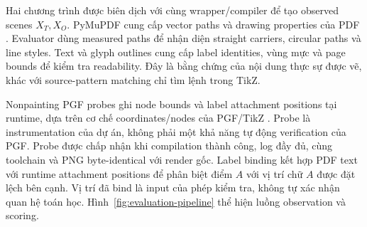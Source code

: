 \documentclass[a4paper,12pt]{article}
\begin{document}
Hai chương trình được biên dịch với cùng wrapper/compiler để tạo observed scenes $X_T,X_O$. PyMuPDF cung cấp vector paths và drawing properties của PDF \cite{pymupdf}. Evaluator dùng measured paths để nhận diện straight carriers, circular paths và line styles. Text và glyph outlines cung cấp label identities, vùng mực và page bounds để kiểm tra readability. Đây là bằng chứng của nội dung thực sự được vẽ, khác với source-pattern matching chỉ tìm lệnh trong TikZ.

Nonpainting PGF probes ghi node bounds và label attachment positions tại runtime, dựa trên cơ chế coordinates/nodes của PGF/TikZ \cite{pgfnodes}. Probe là instrumentation của dự án, không phải một khả năng tự động verification của PGF. Probe được chấp nhận khi compilation thành công, log đầy đủ, cùng toolchain và PNG byte-identical với render gốc. Label binding kết hợp PDF text với runtime attachment positions để phân biệt điểm $A$ với vị trí chữ $A$ được đặt lệch bên cạnh. Vị trí đã bind là input của phép kiểm tra, không tự xác nhận quan hệ toán học. Hình~\ref{fig:evaluation-pipeline} thể hiện luồng observation và scoring.
\end{document}
